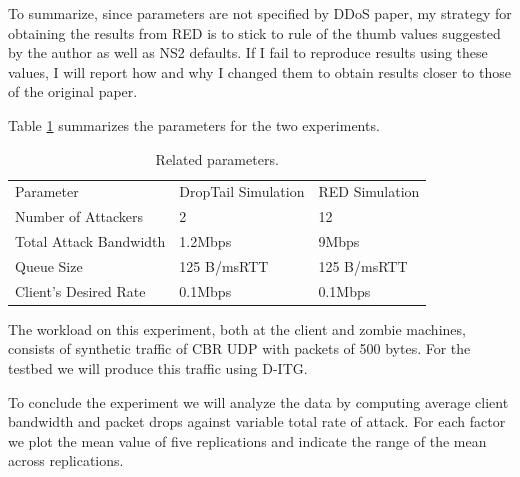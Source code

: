 \documentclass[12pt,twocolumn]{article}
\begin{document}
To summarize, since parameters are not specified by DDoS paper, my strategy for obtaining the results from RED is to stick to rule of the thumb values suggested by the author as well as NS2 defaults.
If I fail to reproduce results using these values, I will report how and why I changed them to obtain results closer to those of the original paper.

Table \ref{tt} summarizes the parameters for the two experiments.

\begin{table}
    \centering
    \begin{tabularx}{0.5\textwidth}{X|X|X}
        Parameter & DropTail Simulation & RED Simulation \\
        Number of Attackers & 2 & 12 \\
        Total Attack Bandwidth & 1.2Mbps & 9Mbps \\
        Queue Size & 125 B/msRTT & 125 B/msRTT \\
        Client's Desired Rate & 0.1Mbps & 0.1Mbps \\
    \end{tabularx}
    \caption{Related parameters.}\label{tt}
\end{table}



The workload on this experiment, both at the client and zombie machines, consists of synthetic traffic of CBR UDP with packets of 500 bytes.
For the testbed we will produce this traffic using D-ITG.

To conclude the experiment we will analyze the data by computing average client bandwidth and packet drops against variable total rate of attack.
For each factor we plot the mean value of five replications and indicate the range of the mean across replications. 
\end{document}
